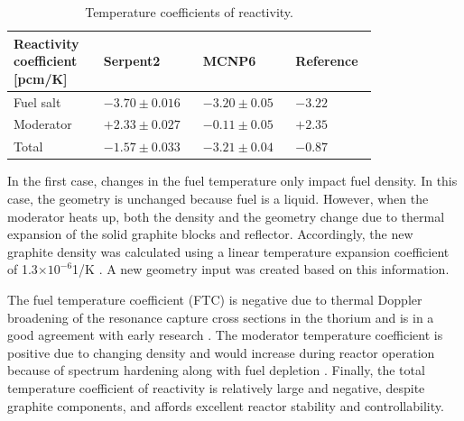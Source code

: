 \documentclass{anstrans}
\begin{document}
\captionsetup[table]{
  labelsep = newline,
  name = TABLE, justification=justified,
  singlelinecheck=false,%
  labelsep=colon,%
  skip = \medskipamount}
\begin{table}[h!]
  \caption{Temperature coefficients of reactivity.}
\begin{tabular}{p{0.22\linewidth} p{0.22\linewidth} p{0.21\linewidth} 
        p{0.15\linewidth}} \toprule
   Reactivity coefficient [pcm/K]  & Serpent2      & MCNP6 
        \cite{park_whole_2015}   & Reference \cite{robertson_conceptual_1971}      
        \\ \midrule
Fuel salt        & $-3.70\pm0.016$ & $-3.20\pm0.05$ & $-3.22$ \\ \midrule
Moderator        & $+2.33\pm0.027$ & $-0.11\pm0.05$ & $+2.35$ \\ \midrule
Total            & $-1.57\pm0.033$ & $-3.21\pm0.04$ & $-0.87$ \\
\bottomrule
\end{tabular}
  \label{tab:tcoef}
\end{table}
In the first case, changes in the fuel temperature only impact fuel density. In 
this case, the geometry is unchanged because fuel is a liquid. However, when 
the moderator heats up, both the density and the geometry change due to thermal 
expansion of the solid graphite blocks and reflector. Accordingly, the new 
graphite density was calculated using a linear temperature expansion 
coefficient of 1.3$\times10^{-6}$1/K \cite{robertson_conceptual_1971}. A new 
geometry input was created based on this information.

The fuel temperature coefficient (FTC) is negative due to thermal Doppler 
broadening of the resonance capture cross sections in the thorium and is in a 
good agreement with early research 
\cite{robertson_conceptual_1971,park_whole_2015}. The moderator temperature 
coefficient is positive due to changing density and would increase during 
reactor operation because of spectrum hardening along with fuel depletion 
\cite{park_whole_2015}. Finally, the total temperature coefficient of 
reactivity is relatively large and negative, despite graphite components, and 
affords excellent reactor stability and controllability.
\end{document}
